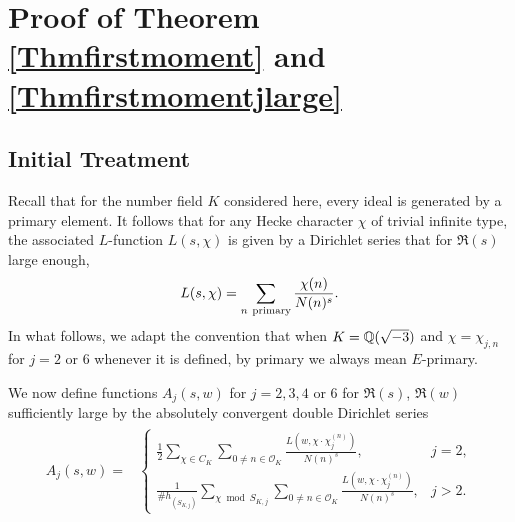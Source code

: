 \documentclass[twoside,leqno,10pt, A4]{amsart}
\begin{document}
\section{Proof of Theorem \ref{Thmfirstmoment} and \ref{Thmfirstmomentjlarge}}
\label{sec Poisson}

\subsection{Initial Treatment}

  Recall that for the number field $K$ considered here, every ideal is generated by a primary element. It follows that for any Hecke character
$\chi$ of trivial infinite type, the associated $L$-function $L(s,\chi)$ is given by a Dirichlet series that for $\Re(s)$ large enough,
\begin{align}
\label{Lseries}
    L(s, \chi) =\sum_{n \mathrm{\ primary}}\frac {\chi(n)}{N(n)^s}.
\end{align}
   In what follows, we adapt the convention that when $K=\mathbb Q(\sqrt{-3})$ and $\chi=\chi_{j, n}$ for $j=2$ or $6$ whenever it is defined, by
primary we always mean $E$-primary. \newline

  We now define functions $A_j(s,w)$ for $j=2,3, 4$ or $6$ for $\Re(s)$, $\Re(w)$ sufficiently large by the absolutely convergent double Dirichlet
series
\begin{align}
\label{Aswexp}
\begin{split}
A_j(s,w)=&
\begin{cases}
\displaystyle \frac {1}{2}\sum_{\chi \in C_K}\sum_{0 \neq n \in \mathcal O_K}\frac{L(w, \chi \cdot \chi^{(n)}_{j})}{N(n)^s}, & j=2, \\
\displaystyle \frac {1}{\#h_{(S_{K,j})}}\sum_{\chi \bmod {S_{K,j}}}\sum_{0 \neq n \in \mathcal O_K}\frac{L(w, \chi \cdot
\chi^{(n)}_{j})}{N(n)^s}, & j >2.
\end{cases}
\end{split}
\end{align}
\end{document}
